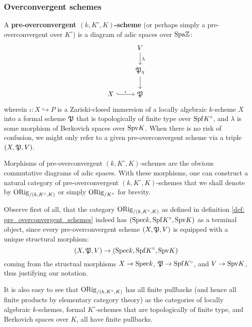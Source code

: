         \subsubsection{Overconvergent schemes}
            \begin{definition} \label{def: pre_overconvergent_schemes}
                A \textbf{pre-overconvergent $(k, K^{\circ}, K)$-scheme} (or perhaps simply a pre-overconvergent over $K^{\circ}$) is a diagram of adic spaces over $\mathrm{Spa} \mathbb{Z}$:
                    $$
                        \begin{tikzcd}
                        	& V \\
                        	& {\frakP_{\eta}} \\
                        	X & {\frakP}
                        	\arrow["\iota", hook, from=3-1, to=3-2]
                        	\arrow["\lambda", from=1-2, to=2-2]
                        	\arrow[from=2-2, to=3-2]
                        \end{tikzcd}
                    $$
                wherein $\iota: X \hookrightarrow P$ is a Zariski-closed immersion of a locally algebraic $k$-scheme $X$ into a formal scheme $\mathfrak{P}$ that is topologically of finite type over $\mathrm{Spf} K^{\circ}$, and $\lambda$ is some morphism of Berkovich spaces over $\mathrm{Spv} K$. When there is no risk of confusion, we might only refer to a given pre-overconvergent scheme via a triple $(X, \mathfrak{P}, V)$. 
                
                Morphisms of pre-overconvergent $(k, K^{\circ}, K)$-schemes are the obvious commutative diagrams of adic spaces. With these morphisms, one can construct a natural category of pre-overconvergent $(k, K^{\circ}, K)$-schemes that we shall denote by $\mathrm{ORig}_{/(k, K^{\circ}, K)}$ or simply $\mathrm{ORig}_{/K^{\circ}}$ for brevity.
            \end{definition}
            \begin{remark}
                Observe first of all, that the category $\mathrm{ORig}_{/(k, K^{\circ}, K)}$ as defined in definition \ref{def: pre_overconvergent_schemes} indeed has $(\mathrm{Spec} k, \mathrm{Spf} K^{\circ}, \mathrm{Spv} K)$ as a terminal object, since every pre-overconvergent scheme $(X, \mathfrak{P}, V)$ is equipped with a unique structural morphism:
                    $$(X, \mathfrak{P}, V) \to (\mathrm{Spec} k, \mathrm{Spf} K^{\circ}, \mathrm{Spv} K)$$
                coming from the structual morphisms $X \to \mathrm{Spec} k$, $\mathfrak{P} \to \mathrm{Spf} K^{\circ}$, and $V \to \mathrm{Spv} K$, thus justifying our notation. 
                
                It is also easy to see that $\mathrm{ORig}_{/(k, K^{\circ}, K)}$ has all finite pullbacks (and hence all finite products by elementary category theory) as the categories of locally algebraic $k$-schemes, formal $K^{\circ}$-schemes that are topologically of finite type, and Berkovich spaces over $K$, all have finite pullbacks.
            \end{remark}
